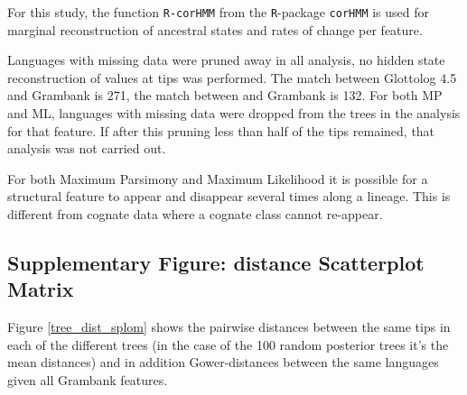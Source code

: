 \documentclass[12pt,letterpaper]{article}
\begin{document}
For this study, the function \texttt{R-corHMM} from the \texttt{R}-package \texttt{corHMM} \citep{R-corHMM} is used for marginal reconstruction of ancestral states and rates of change per feature. %


Languages with missing data were pruned away in all analysis, no hidden state reconstruction of values at tips was performed. The match between Glottolog 4.5 and Grambank is 271, the match between \citet{grayetal_2009} and Grambank is 132. For both MP and ML, languages with missing data were dropped from the trees in the analysis for that feature. If after this pruning less than half of the tips remained, that analysis was not carried out.

For both Maximum Parsimony and Maximum Likelihood it is possible for a structural feature to appear and disappear several times along a lineage. This is different from cognate data where a cognate class cannot re-appear.

\FloatBarrier
\newpage
\subsection{Supplementary Figure: distance Scatterplot Matrix}
Figure \ref{tree_dist_splom} shows the pairwise distances between the same tips in each of the different trees (in the case of the 100 random posterior trees it's the mean distances) and in addition Gower-distances between the same languages given all Grambank features.
\end{document}
